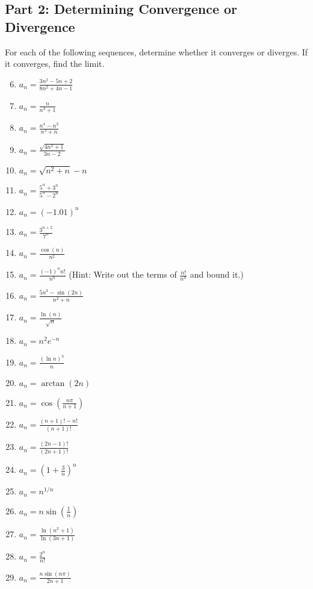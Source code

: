 \documentclass{article}
\begin{document}
\subsection*{Part 2: Determining Convergence or Divergence}
For each of the following sequences, determine whether it converges or diverges. If it converges, find the limit.

\begin{enumerate}
    \setcounter{enumi}{5}
    \item $a_n = \frac{3n^2 - 5n + 2}{8n^2 + 4n - 1}$
    \item $a_n = \frac{n}{n^3 + 1}$
    \item $a_n = \frac{n^4 - n^2}{n^3 + n}$

    \item $a_n = \frac{\sqrt{4n^2 + 1}}{3n - 2}$
    \item $a_n = \sqrt{n^2 + n} - n$

    \item $a_n = \frac{5^n + 3^n}{5^n - 2^n}$
    \item $a_n = (-1.01)^n$
    \item $a_n = \frac{3^{n+2}}{7^n}$

    \item $a_n = \frac{\cos(n)}{n^2}$
    \item $a_n = \frac{(-1)^n n!}{n^n}$ (Hint: Write out the terms of $\frac{n!}{n^n}$ and bound it.)
    \item $a_n = \frac{5n^2 - \sin(2n)}{n^2 + n}$

    \item $a_n = \frac{\ln(n)}{\sqrt{n}}$
    \item $a_n = n^2 e^{-n}$
    \item $a_n = \frac{(\ln n)^3}{n}$

    \item $a_n = \arctan(2n)$
    \item $a_n = \cos\left(\frac{n\pi}{n+1}\right)$

    \item $a_n = \frac{(n+1)! - n!}{(n+1)!}$
    \item $a_n = \frac{(2n-1)!}{(2n+1)!}$
    
    \item $a_n = \left(1 + \frac{3}{n}\right)^n$
    \item $a_n = n^{1/n}$
    
    \item $a_n = n \sin\left(\frac{1}{n}\right)$
    \item $a_n = \frac{\ln(n^2+1)}{\ln(3n+1)}$
    \item $a_n = \frac{2^n}{n!}$
    \item $a_n = \frac{n\sin(n\pi)}{2n+1}$
\end{enumerate}
\end{document}
